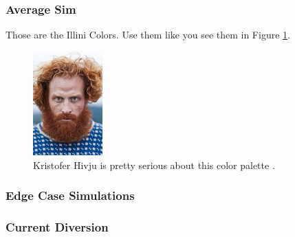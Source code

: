 \begin{frame}
  \frametitle{Average Sim}
        Those are the Illini Colors. Use them like you see them in Figure 
        \ref{fig:fierce}.
  \begin{figure}[htbp!]
    \begin{center}
      \includegraphics[height=4cm]{./images/fierce}
    \end{center}
          \caption{Kristofer Hivju is pretty serious about this color palette \cite{lastname_firstword_1900}.}
    \label{fig:fierce}
  \end{figure}
\end{frame}

\begin{frame}
  \frametitle{Edge Case Simulations}
\end{frame}

\begin{frame}
  \frametitle{Current Diversion}
\end{frame}


